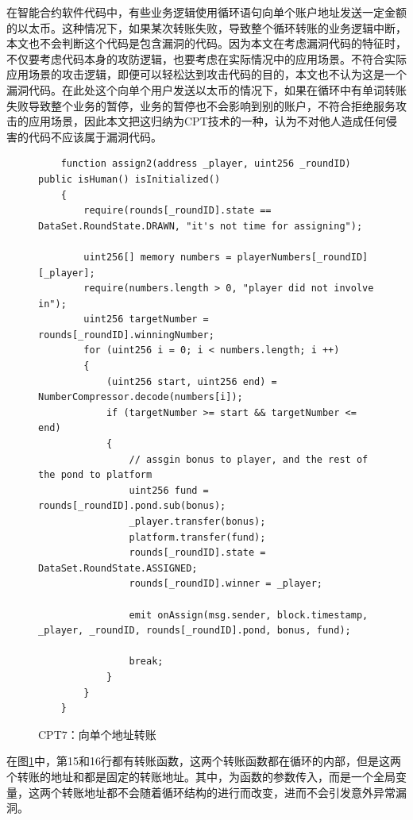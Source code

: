 在智能合约软件代码中，有些业务逻辑使用循环语句向单个账户地址发送一定金额的以太币。这种情况下，如果某次转账失败，导致整个循环转账的业务逻辑中断，本文也不会判断这个代码是包含漏洞的代码。因为本文在考虑漏洞代码的特征时，不仅要考虑代码本身的攻防逻辑，也要考虑在实际情况中的应用场景。不符合实际应用场景的攻击逻辑，即便可以轻松达到攻击代码的目的，本文也不认为这是一个漏洞代码。在此处这个向单个用户发送以太币的情况下，如果在循环中有单词转账失败导致整个业务的暂停，业务的暂停也不会影响到别的账户，不符合拒绝服务攻击的应用场景，因此本文把这归纳为CPT技术的一种，认为不对他人造成任何侵害的代码不应该属于漏洞代码。
\begin{figure}
\begin{minipage}[htbp]{1.0\linewidth}
    \begin{lstlisting}
    function assign2(address _player, uint256 _roundID) public isHuman() isInitialized()
    {
        require(rounds[_roundID].state == DataSet.RoundState.DRAWN, "it's not time for assigning");

        uint256[] memory numbers = playerNumbers[_roundID][_player];
        require(numbers.length > 0, "player did not involve in");
        uint256 targetNumber = rounds[_roundID].winningNumber;
        for (uint256 i = 0; i < numbers.length; i ++)
        {
            (uint256 start, uint256 end) = NumberCompressor.decode(numbers[i]);
            if (targetNumber >= start && targetNumber <= end)
            {
                // assgin bonus to player, and the rest of the pond to platform
                uint256 fund = rounds[_roundID].pond.sub(bonus);
                _player.transfer(bonus);
                platform.transfer(fund);
                rounds[_roundID].state = DataSet.RoundState.ASSIGNED;
                rounds[_roundID].winner = _player;

                emit onAssign(msg.sender, block.timestamp, _player, _roundID, rounds[_roundID].pond, bonus, fund);

                break;
            }
        }
    }
    \end{lstlisting}
\end{minipage}
\vspace{-5mm}
\caption{CPT7：向单个地址转账}
\label{fig:ss7_example}
\end{figure}

在图\ref{fig:ss7_example}中，第15和16行都有转账函数，这两个转账函数都在循环的内部，但是这两个转账的地址和都是固定的转账地址。其中，为函数的参数传入，而是一个全局变量，这两个转账地址都不会随着循环结构的进行而改变，进而不会引发意外异常漏洞。

